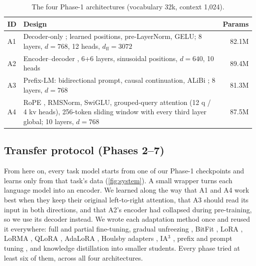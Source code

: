 \documentclass[11pt, oneside]{article}
\begin{document}
\begin{table}[!t]\centering\footnotesize
\caption{The four Phase-1 architectures (vocabulary 32k, context 1,024).}\label{tab:arch}
\begin{tabularx}{\linewidth}{lXr}\toprule
ID & Design & Params\\\midrule
A1 & Decoder-only \cite{radford2019gpt2}; learned positions, pre-LayerNorm, GELU; 8 layers, $d=768$, 12 heads, $d_\text{ff}=3072$ & 82.1M\\
A2 & Encoder--decoder \cite{vaswani2017attention}, 6+6 layers, sinusoidal positions, $d=640$, 10 heads & 89.4M\\
A3 & Prefix-LM: bidirectional prompt, causal continuation, ALiBi \cite{press2022alibi}; 8 layers, $d=768$ & 81.3M\\
A4 & RoPE \cite{su2021roformer}, RMSNorm, SwiGLU, grouped-query attention \cite{ainslie2023gqa} (12 q / 4 kv heads),
256-token sliding window \cite{beltagy2020longformer} with every third layer global; 10 layers, $d=768$ & 87.5M\\
\bottomrule\end{tabularx}\end{table}

\subsection{Transfer protocol (Phases 2--7)}
From here on, every task model starts from one of our Phase-1 checkpoints and learns only from that task's
data (\autoref{fig:system}).  A small wrapper turns each language model into an encoder.  We learned along the
way that A1 and A4 work best when they keep their original left-to-right attention, that A3 should read its
input in both directions, and that A2's encoder had collapsed during pre-training, so we use its decoder
instead.  We wrote each adaptation method once and reused it everywhere: full and partial fine-tuning, gradual
unfreezing \cite{howard2018ulmfit}, BitFit \cite{benzaken2022bitfit}, LoRA \cite{hu2022lora}, LoRMA
\cite{bihany2025lorma}, QLoRA \cite{dettmers2023qlora}, AdaLoRA \cite{zhang2023adalora}, Houlsby adapters
\cite{houlsby2019adapters}, IA$^3$ \cite{liu2022ia3}, prefix \cite{li2021prefix} and prompt tuning
\cite{lester2021prompt}, and knowledge distillation \cite{hinton2015kd} into smaller students.  Every phase
tried at least six of them, across all four architectures.
\end{document}

